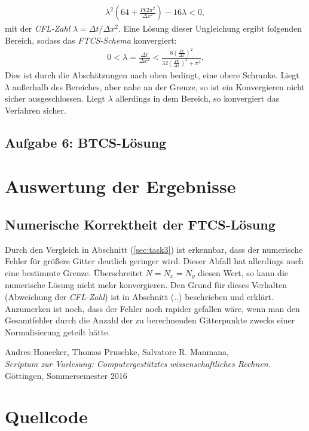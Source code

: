 \documentclass[12pt,a4paper,titlepage,headinclude,bibtotoc]{scrartcl}
\begin{document}
\begin{align}
\lambda^2 \left(64 + \frac{Pe 2 \pi^2}{\Delta x^2} \right) -16 \lambda <0,
\end{align}
mit der \textit{CFL-Zahl} $\lambda = \Delta t/\Delta x^2$.
Eine Lösung dieser Ungleichung ergibt folgenden Bereich, sodass das \textit{FTCS-Schema} konvergiert:
\begin{align}
0 < \lambda = \frac{\Delta t}{\Delta x^2} < \frac{8 \left(\frac{Pe}{\Delta x}\right)^2}{32\left(\frac{Pe}{\Delta x}\right)^2 + \pi^2}.
\end{align}
Dies ist durch die Abschätzungen nach oben bedingt, eine obere Schranke. Liegt $\lambda$ außerhalb des Bereiches, aber nahe an der Grenze, so ist ein Konvergieren nicht sicher ausgeschlossen. Liegt $\lambda$ allerdings in dem Bereich, so konvergiert das Verfahren sicher.
\subsection{Aufgabe 6: BTCS-Lösung}
\label{sec:task6}

\section{Auswertung der Ergebnisse}
\label{sec:interpretation}
\subsection{Numerische Korrektheit der FTCS-Lösung}
\label{sec:disc_num_corr}
Durch den Vergleich in Abschnitt (\ref{sec:task3}) ist erkennbar, dass der numerische Fehler für größere Gitter deutlich geringer wird. Dieser Abfall hat allerdings auch eine bestimmte Grenze. Überschreitet $N = N_x = N_y$ diesen Wert, so kann die numerische Lösung nicht mehr konvergieren. Den Grund für dieses Verhalten (Abweichung der \textit{CFL-Zahl}) ist in Abschnitt (..) beschrieben und erklärt. Anzumerken ist noch, dass der Fehler noch rapider gefallen wäre, wenn man den Gesamtfehler durch die Anzahl der zu berechnenden Gitterpunkte zwecks einer Normalisierung geteilt hätte.

\begin{thebibliography}{9}
  Andres Honecker, Thomas Pruschke, Salvatore R. Manmana, \\
  \emph{Scriptum zur Vorlesung: Computergestütztes wissenschaftliches Rechnen}. \\
 Göttingen,
  Sommersemester 2016
 
 
 
 \end{thebibliography}

\appendix
\section{Quellcode}
\label{sec:source} 
%
\end{document}
